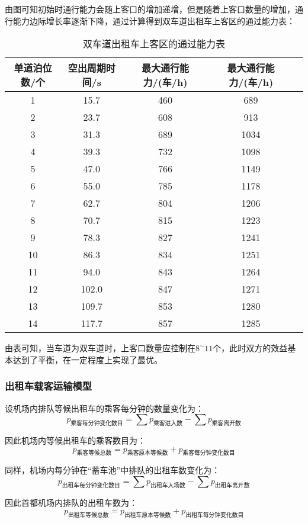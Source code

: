 \documentclass[withoutpreface,bwprint]{cumcmthesis} %
\begin{document}
由图可知初始时通行能力会随上客口的增加递增，但是随着上客口数量的增加，通行能力边际增长率逐渐下降，通过计算得到双车道出租车上客区的通过能力表：

\begin{table}[!htbp]
	\caption{双车道出租车上客区的通过能力表}\label{tab:008} \centering
	\begin{tabular}{ccccc}
		\toprule[2pt]
		单道泊位数/个 & 空出周期时间/s & 最大通行能力/(车/h) & 最大通行能力/(车/h)\\
		\midrule[1pt]
		1 & 15.7 & 460 & 689\\
    	2 & 23.7 & 608 & 913\\ 
	    3 & 31.3 & 689 & 1034\\
	    4 & 39.3 & 732 & 1098\\
	    5 & 47.0 & 766 & 1149\\
	    6 & 55.0 & 785 & 1178\\
	    7 & 62.7 & 804 & 1206\\
	    8 & 70.7 & 815 & 1223\\
	    9 & 78.3 & 827 & 1241\\
	    10 & 86.3 & 834 & 1251\\
	    11 & 94.0 & 843 & 1264\\
    	12 & 102.0 & 847 & 1271\\
	    13 & 109.7 & 853 & 1280\\
	    14 & 117.7 & 857 & 1285\\
		\bottomrule[1.5pt]
	\end{tabular}
\end{table}
\newpage
由表可知，当车道为双车道时，上客口数量应控制在$8^{\sim} 11$个，此时双方的效益基本达到了平衡，在一定程度上实现了最优。


\subsubsection{出租车载客运输模型}
设机场内排队等候出租车的乘客每分钟的数量变化为：
$$
p_{\text{乘客每分钟变化数目}}=\sum p_{\text{乘客进入数}}-\sum p_{\text{乘客离开数}}
$$

因此机场内等候出租车的乘客数目为：
$$
p_{\text{乘客等候总数}}=p_{\text{乘客原本等候数}}+p_{\text{乘客每分钟变化数目}}
$$


同样，机场内每分钟在“蓄车池”中排队的出租车数变化为：
$$
p_{\text{出租车每分钟变化数目}}=\sum p_{\text{出租车入场数}}-\sum p_{\text{出租车离开数}}
$$

因此首都机场内排队的出租车数为：
$$
p_{\text{出租车等候总数}}=p_{\text{出租车原本等候数}}+p_{\text{出租车每分钟变化数目}}
$$
\end{document}
